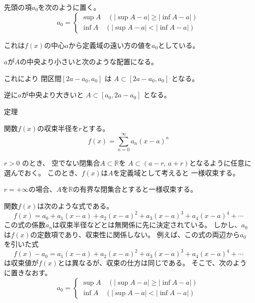 \documentclass[12pt,b5paper]{ltjsarticle}
\begin{document}
先頭の項$a_0$を次のように置く。
 \begin{equation}
  a_0 =
   \begin{cases}
    \sup A \quad ( | \sup A -a | \geq | \inf A -a |)\\
    \inf A \quad ( | \sup A -a | < | \inf A -a |)
   \end{cases}
 \end{equation}

これは$f(x)$の中心$a$から定義域の遠い方の値を$a_0$としている。

$a$が$A$の中央より小さいと次のような配置になる。


これにより 閉区間$[2a-a_0, a_0]$ は
$A\subset [2a-a_0, a_0]$ となる。

逆に$a$が中央より大きいと
$A\subset [a_0, 2a-a_0]$ となる。


\newpage

定理

関数$f(x)$の収束半径を$r$とする。
 \begin{equation}
  f(x) = \sum_{n=0}^{\infty} a_n (x-a)^n
 \end{equation}

$r>0$ のとき、
空でない閉集合$A\subset \mathbb{R}$を
$A\subset (a-r,\,a+r)$となるように任意に選んでおく。
このとき、$f(x)$は$A$を定義域として考えると
一様収束する。

$r=+\infty$の場合、$A$を$\mathbb{R}$の有界な閉集合とすると一様収束する。

\hrulefill

関数$f(x)$は次のような式である。
 \begin{equation}
  f(x) =%
   a_0 + a_1(x-a) + a_2(x-a)^2 + a_3(x-a)^3 + a_4(x-a)^4 + \cdots
 \end{equation}
この式の係数$a_n$は収束半径などとは無関係に先に決定されている。
しかし、$a_0$は$f(x)$の定数項であり、収束性に関係しない。
例えば、この式の両辺から$a_0$を引いた式
 \begin{equation}
  f(x) - a_0 =%
   a_1(x-a) + a_2(x-a)^2 + a_3(x-a)^3 + a_4(x-a)^4 + \cdots
 \end{equation}
は収束値が$f(x)$とは異なるが、収束の仕方は同じである。
そこで、次のように置きなおす。
 \begin{equation}
  a_0 =
   \begin{cases}
    \sup A \quad ( | \sup A -a | \geq | \inf A -a |)\\
    \inf A \quad ( | \sup A -a | < | \inf A -a |)
   \end{cases}
 \end{equation}
\end{document}

